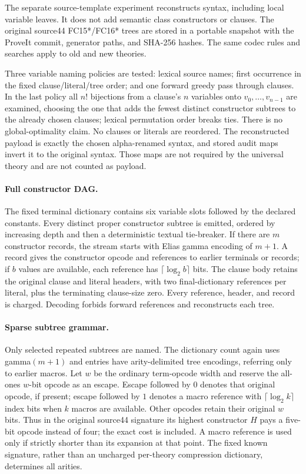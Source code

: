 The separate source-template experiment reconstructs syntax, including local
variable leaves.  It does not add semantic class constructors or clauses.
The original source44 FC15*/FC16* trees are stored in a portable snapshot with
the ProveIt commit, generator paths, and SHA-256 hashes.  The same codec rules
and searches apply to old and new theories.

Three variable naming policies are tested: lexical source names; first
occurrence in the fixed clause/literal/tree order; and one forward greedy
pass through clauses.  In the last policy all $n!$ bijections from a clause's
$n$ variables onto $v_0,\ldots,v_{n-1}$ are examined, choosing the one that
adds the fewest distinct constructor subtrees to the already chosen clauses;
lexical permutation order breaks ties.  There is no global-optimality claim.
No clauses or literals are reordered.  The reconstructed payload is exactly
the chosen alpha-renamed syntax, and stored audit maps invert it to the
original syntax.  Those maps are not required by the universal theory and
are not counted as payload.

\paragraph{Full constructor DAG.}
The fixed terminal dictionary contains six variable slots followed by the
declared constants.  Every distinct proper constructor subtree is emitted,
ordered by increasing depth and then a deterministic textual tie-breaker.
If there are $m$ constructor records, the stream starts with Elias gamma
encoding of $m+1$.  A record gives the constructor opcode and references to
earlier terminals or records; if $b$ values are available, each reference has
$\lceil\log_2 b\rceil$ bits.  The clause body retains the original clause
and literal headers, with two final-dictionary references per literal, plus
the terminating clause-size zero.  Every reference, header, and record is
charged.  Decoding forbids forward references and reconstructs each tree.

\paragraph{Sparse subtree grammar.}
Only selected repeated subtrees are named.  The dictionary count again uses
gamma$(m+1)$ and entries have arity-delimited tree encodings, referring only
to earlier macros.  Let $w$ be the ordinary term-opcode width and reserve the
all-ones $w$-bit opcode as an escape.  Escape followed by $0$ denotes that
original opcode, if present; escape followed by $1$ denotes a macro reference
with $\lceil\log_2 k\rceil$ index bits when $k$ macros are available.
Other opcodes retain their original $w$ bits.  Thus in the original source44
signature its highest constructor $H$ pays a five-bit opcode instead of four;
the exact cost is included.  A macro reference is used only if strictly
shorter than its expansion at that point.  The fixed known signature, rather
than an uncharged per-theory compression dictionary, determines all arities.

